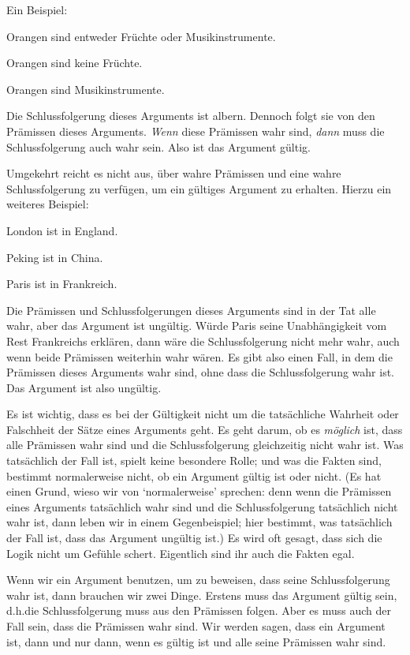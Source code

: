 Ein Beispiel:
	\begin{earg}
		\item[] Orangen sind entweder Früchte oder Musikinstrumente.
		\item[] Orangen sind keine Früchte.
		\item[\therefore] Orangen sind Musikinstrumente.
	\end{earg}
Die Schlussfolgerung dieses Arguments ist albern. Dennoch folgt sie von den Prämissen dieses Arguments. \emph{Wenn} diese Prämissen wahr sind, \emph{dann} muss die Schlussfolgerung auch wahr sein. Also ist das Argument gültig.

Umgekehrt reicht es nicht aus, über wahre Prämissen und eine wahre Schlussfolgerung zu verfügen, um ein gültiges Argument zu erhalten. Hierzu ein weiteres Beispiel:
	\begin{earg}
		\item[] London ist in England.
		\item[] Peking ist in China.
		\item[\therefore] Paris ist in Frankreich.
	\end{earg}
Die Prämissen und Schlussfolgerungen dieses Arguments sind in der Tat alle wahr, aber das Argument ist ungültig. Würde Paris seine Unabhängigkeit vom Rest Frankreichs erklären, dann wäre die Schlussfolgerung nicht mehr wahr, auch wenn beide Prämissen weiterhin wahr wären. Es gibt also einen Fall, in dem die Prämissen dieses Arguments wahr sind, ohne dass die Schlussfolgerung wahr ist. Das Argument ist also ungültig.

Es ist wichtig, dass es bei der Gültigkeit nicht um die tatsächliche Wahrheit oder Falschheit der Sätze eines Arguments geht. Es geht darum, ob es \emph{möglich} ist, dass alle Prämissen wahr sind und die Schlussfolgerung gleichzeitig nicht wahr ist. Was tatsächlich der Fall ist, spielt keine besondere Rolle; und was die Fakten sind, bestimmt normalerweise nicht, ob ein Argument gültig ist oder nicht. (Es hat einen Grund, wieso wir von `normalerweise' sprechen: denn wenn die Prämissen eines Arguments tatsächlich wahr sind und die Schlussfolgerung tatsächlich nicht wahr ist, dann leben wir in einem Gegenbeispiel; hier bestimmt, was tatsächlich der Fall ist, dass das Argument ungültig ist.) Es wird oft gesagt, dass sich die Logik nicht um Gefühle schert. Eigentlich sind ihr auch die Fakten egal.

Wenn wir ein Argument benutzen, um zu beweisen, dass seine Schlussfolgerung wahr ist, dann brauchen wir zwei Dinge. Erstens muss das Argument gültig sein, d.h.\@ die Schlussfolgerung muss aus den Prämissen folgen. Aber es muss auch der Fall sein, dass die Prämissen wahr sind. Wir werden sagen, dass ein Argument  ist, dann und nur dann, wenn es gültig ist und alle seine Prämissen wahr sind. 

